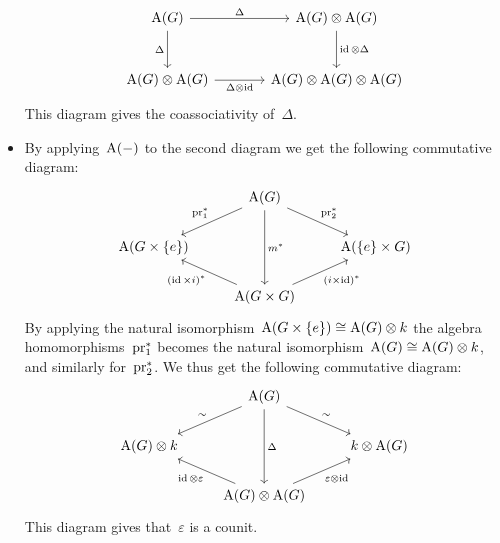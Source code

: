 \begin{fluff}
\begin{itemize}
      \begin{equation}
      \label{coassociativity}
        \begin{tikzcd}[sep = large]
            \coord(G)
            \arrow{r}[above]{\Delta}
            \arrow{d}[left]{\Delta}
          & \coord(G) \tensor \coord(G)
            \arrow{d}[right]{\id \tensor \Delta}
          \\
            \coord(G) \tensor \coord(G)
            \arrow{r}[below]{\Delta \tensor \id}
          & \coord(G) \tensor \coord(G) \tensor \coord(G)
        \end{tikzcd}
      \end{equation}
      This diagram gives the coassociativity of~$\Delta$.
    \item
      By applying~$\operatorname{A}(-)$ to the second diagram we get the following commutative diagram:
      \[
        \begin{tikzcd}
            {}
          & \coord(G)
            \arrow{dl}[above left]{\pr_1^*}
            \arrow{dd}[right]{m^*}
            \arrow{dr}[above right]{\pr_2^*}
          & {}
          \\
            \coord(G \times \{e\})
          & {}
          & \coord(\{e\} \times G)
          \\
            {}
          & \coord(G \times G)
            \arrow{ul}[below left]{(\id \times i)^*}
            \arrow{ur}[below right]{(i \times \id)^*}
          & {}
        \end{tikzcd}
      \]
      By applying the natural isomorphism~$\operatorname{A}(G \times \{e\}) \cong \operatorname{A}(G) \mathbin{\otimes} k$ the algebra homomorphisms~$\operatorname{pr}_1^*$ becomes the natural isomorphism~$\operatorname{A}(G) \cong \operatorname{A}(G) \mathbin{\otimes} k$, and similarly for~$\operatorname{pr}_2^*$.
      We thus get the following commutative diagram:
      \[
        \begin{tikzcd}
            {}
          & \coord(G)
            \arrow{dl}[above left]{\sim}
            \arrow{dd}[right]{\Delta}
            \arrow{dr}[above right]{\sim}
          & {}
          \\
            \coord(G) \tensor k
          & {}
          & k \tensor \coord(G)
          \\
            {}
          & \coord(G) \tensor \coord(G)
            \arrow{ul}[below left]{\id \tensor \varepsilon}
            \arrow{ur}[below right]{\varepsilon \tensor \id}
          & {}
        \end{tikzcd}
      \]
      This diagram gives that~$\varepsilon$ is a counit.
  \end{itemize}

\end{fluff}
